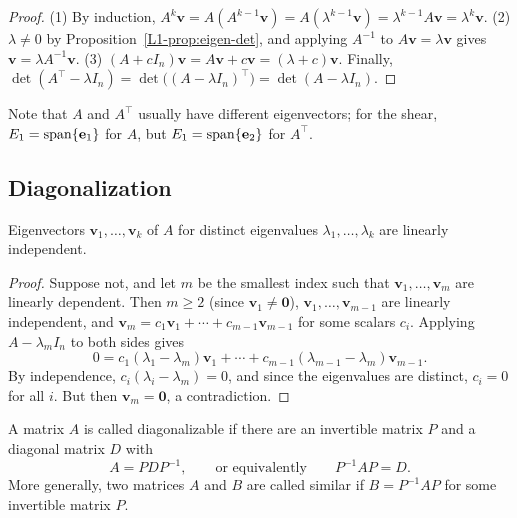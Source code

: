 \begin{proof}
    (1) By induction, $A^k \mathbf{v} = A(A^{k-1} \mathbf{v}) = A(\lambda^{k-1} \mathbf{v}) = \lambda^{k-1} A\mathbf{v} = \lambda^k \mathbf{v}$. (2) $\lambda \neq 0$ by Proposition~\ref{L1-prop:eigen-det}, and applying $A^{-1}$ to $A\mathbf{v} = \lambda \mathbf{v}$ gives $\mathbf{v} = \lambda A^{-1}\mathbf{v}$. (3) $(A + cI_n)\mathbf{v} = A\mathbf{v} + c\mathbf{v} = (\lambda + c)\mathbf{v}$. Finally, $\det(A^\top - \lambda I_n) = \det\big((A - \lambda I_n)^\top\big) = \det(A - \lambda I_n)$.
\end{proof}

Note that $A$ and $A^\top$ usually have different eigenvectors; for the shear, $E_1 = \operatorname{span}\{\mathbf{e}_1\}$ for $A$, but $E_1 = \operatorname{span}\{\mathbf{e}_2\}$ for $A^\top$.

\subsection{Diagonalization}

\begin{theorem}\label{L1-thm:eigen-independent}
    Eigenvectors $\mathbf{v}_1, \ldots, \mathbf{v}_k$ of $A$ for distinct eigenvalues $\lambda_1, \ldots, \lambda_k$ are linearly independent.
\end{theorem}

\begin{proof}
    Suppose not, and let $m$ be the smallest index such that $\mathbf{v}_1, \ldots, \mathbf{v}_m$ are linearly dependent. Then $m \geq 2$ (since $\mathbf{v}_1 \neq \mathbf{0}$), $\mathbf{v}_1, \ldots, \mathbf{v}_{m-1}$ are linearly independent, and $\mathbf{v}_m = c_1 \mathbf{v}_1 + \cdots + c_{m-1} \mathbf{v}_{m-1}$ for some scalars $c_i$. Applying $A - \lambda_m I_n$ to both sides gives
    \[0 = c_1 (\lambda_1 - \lambda_m) \mathbf{v}_1 + \cdots + c_{m-1} (\lambda_{m-1} - \lambda_m) \mathbf{v}_{m-1}.\]
    By independence, $c_i (\lambda_i - \lambda_m) = 0$, and since the eigenvalues are distinct, $c_i = 0$ for all $i$. But then $\mathbf{v}_m = \mathbf{0}$, a contradiction.
\end{proof}

\begin{definition}
    A matrix $A$ is called diagonalizable if there are an invertible matrix $P$ and a diagonal matrix $D$ with
    \[A = PDP^{-1}, \qquad \text{or equivalently} \qquad P^{-1}AP = D.\]
    More generally, two matrices $A$ and $B$ are called similar if $B = P^{-1}AP$ for some invertible matrix $P$.
\end{definition}

